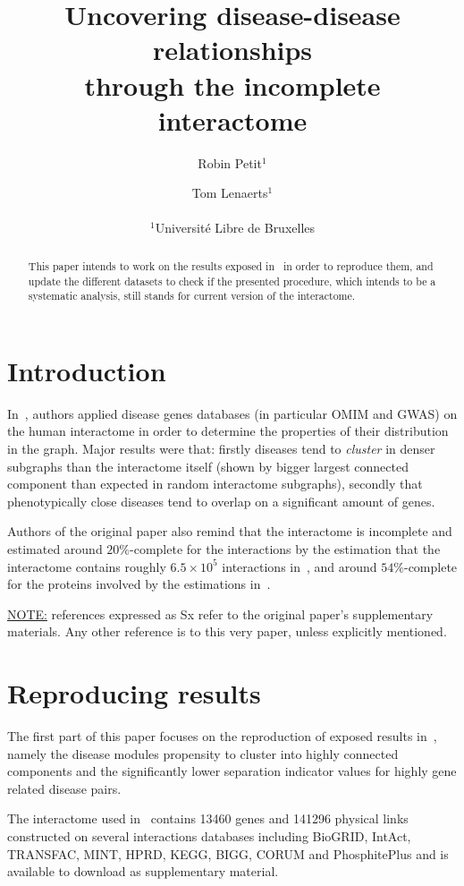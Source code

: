 \documentclass[letterpaper]{article}
\title{Uncovering disease-disease relationships\\through the incomplete interactome}
\author{Robin Petit$^{1}$ \and Tom Lenaerts$^{1}$\\
\mbox{}\\
$^1$Université Libre de Bruxelles}
\begin{document}
\maketitle

\begin{abstract}
  This paper intends to work on the results exposed in~\cite{originalPaper} in order to
	reproduce them, and update the different datasets to check if the presented procedure,
	which intends to be a systematic analysis, still stands for current version of the
	interactome.
\end{abstract}

\section{Introduction}
In~\cite{originalPaper}, authors applied disease genes databases (in particular OMIM and GWAS) on
the human interactome in order to determine the properties of their distribution in the graph.
Major results were that: firstly diseases tend to \textit{cluster} in denser subgraphs than the
interactome itself (shown by bigger largest connected component than expected in random interactome subgraphs),
secondly that phenotypically close diseases tend to overlap on a significant amount of genes.

Authors of the original paper also remind that the interactome is incomplete and estimated around $20\%$-complete
for the interactions by the estimation that the interactome contains roughly $6.5 \times 10^5$ interactions
in~\cite{estimatingTheSizeOfTheHumanInteractome}, and around $54\%$-complete for the proteins involved by the
estimations in~\cite{ATruerMeasureOfOurIgnorance}.

\underline{NOTE:} references expressed as Sx refer to the original paper's supplementary materials. Any
other reference is to this very paper, unless explicitly mentioned.

\section{Reproducing results}
The first part of this paper focuses on the reproduction of exposed results in~\cite{originalPaper},
namely the disease modules propensity to cluster into highly connected components and the significantly
lower separation indicator values for highly gene related disease pairs.

The interactome used in~\cite{originalPaper} contains 13460 genes and 141296 physical links constructed on several
interactions databases including BioGRID, IntAct, TRANSFAC, MINT, HPRD, KEGG, BIGG, CORUM and PhosphitePlus and
is available to download as supplementary material.
\end{document}
